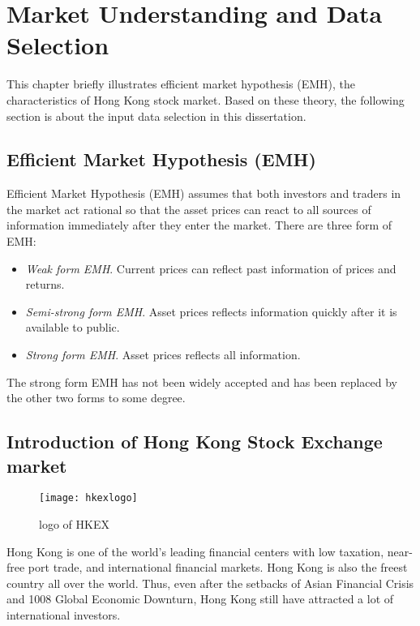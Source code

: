 \chapter{Market Understanding and Data Selection}

\label{ch:market}

This chapter briefly illustrates efficient market hypothesis (EMH), the characteristics of Hong Kong stock market. Based on these theory, the following section is about the input data selection in this dissertation.

\section{Efficient Market Hypothesis (EMH)}
Efficient Market Hypothesis (EMH) assumes that both investors and traders in the market act rational so that the asset prices can react to all sources of information immediately after they enter the market\cite[p.~7]{1_wong_1997}. There are three form of EMH:
\begin{itemize}
	\item \emph{Weak form EMH}. Current prices can reflect past information of prices and returns.
	\item \emph{Semi-strong form EMH}. Asset prices reflects information quickly after it is available to public.
	\item \emph{Strong form EMH}. Asset prices reflects all information.
\end{itemize}

The strong form EMH has not been widely accepted and has been replaced by the other two forms to some degree\cite[p.~133]{leshik2011introduction}.

\section{Introduction of Hong Kong Stock Exchange market}

\begin{figure}[h]
	\centering
	\texttt{[image: hkexlogo]}
	\caption{logo of HKEX}
\end{figure}

Hong Kong is one of the world’s leading financial centers with low taxation, near-free port trade, and international financial markets. Hong Kong is also the freest country all over the world\cite{freedom_ranking_2016}. Thus, even after the setbacks of Asian Financial Crisis and 1008 Global Economic Downturn, Hong Kong still have attracted a lot of international investors.\\

